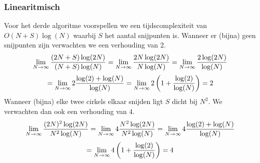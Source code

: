\subsubsection{Linearitmisch}
Voor het derde algoritme voorspellen we een tijdscomplexiteit van $O(N+S)\log(N)$ waarbij $S$ het aantal snijpunten is. Wanneer er (bijna) geen snijpunten zijn verwachten we een verhouding van $2$.
\[
\lim_{
N\rightarrow \infty\\
}
\frac{(2N+S)\log(2N)}{(N+S)\log(N)}
=
\lim_{
N\rightarrow \infty\\
}
\frac{2N\log(2N)}{N\log(N)}
=
\lim_{
N\rightarrow \infty\\
}
\frac{2\log(2N)}{\log(N)}
\]
\[
=
\lim_{
N\rightarrow \infty\\
}
2\frac{\log(2)+\log(N)}{\log(N)}
=
\lim_{
N\rightarrow \infty\\
}
2\left(1 + \frac{\log(2)}{\log(N)}\right)
= 2
\]
\noindent Wanneer (bijna) elke twee cirkels elkaar snijden ligt $S$ dicht bij $N^2$. We verwachten dan ook een verhouding van $4$.
\[
\lim_{
N\rightarrow \infty\\
}
\frac{(2N)^2\log(2N)}{N^2\log(N)}
=
\lim_{
N\rightarrow \infty\\
}
4\frac{N^2\log(2N)}{N^2\log(N)}
=
\lim_{
N\rightarrow \infty\\
}
4\frac{\log(2)+\log(N)}{\log(N)}
\]
\[
=
\lim_{
N\rightarrow \infty\\
}
4\left(1+\frac{\log(2)}{\log(N)}\right)
= 4
\]

